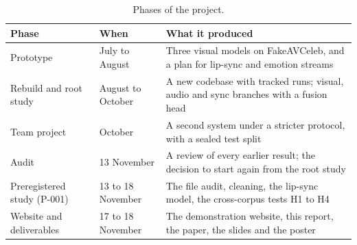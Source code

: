 \begin{table}[ht]
    \centering
    \small
    \caption{Phases of the project.}
    \label{tab:phases}
    \begin{tabularx}{\textwidth}{@{}l l >{\raggedright\arraybackslash}X@{}}
        \toprule
        \textbf{Phase} & \textbf{When} & \textbf{What it produced} \\
        \midrule
        Prototype & July to August & Three visual models on FakeAVCeleb, and a plan for lip-sync and emotion streams \\
        Rebuild and root study & August to October & A new codebase with tracked runs; visual, audio and sync branches with a fusion head \\
        Team project & October & A second system under a stricter protocol, with a sealed test split \\
        Audit & 13 November & A review of every earlier result; the decision to start again from the root study \\
        Preregistered study (P-001) & 13 to 18 November & The file audit, cleaning, the lip-sync model, the cross-corpus tests H1 to H4 \\
        Website and deliverables & 17 to 18 November & The demonstration website, this report, the paper, the slides and the poster \\
        \bottomrule
    \end{tabularx}
\end{table}

